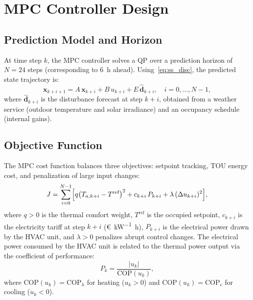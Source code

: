 \documentclass[conference,a4paper]{IEEEtran}[2015/08/26]
\newcommand{\vek}[1]{\bm{#1}}
\begin{document}
\section{MPC Controller Design}
\label{sec:mpc}

\subsection{Prediction Model and Horizon}

At time step $k$, the MPC controller solves a QP over a prediction
horizon of $N = 24$ steps (corresponding to \SI{6}{\hour} ahead).
Using~\cref{eq:ss_disc}, the predicted state trajectory is:
\begin{equation}
  \vek{x}_{k+i+1} = A\,\vek{x}_{k+i} + B\,u_{k+i} + E\,\hat{\vek{d}}_{k+i},
  \quad i = 0, \ldots, N-1,
  \label{eq:pred}
\end{equation}
where $\hat{\vek{d}}_{k+i}$ is the disturbance forecast at step $k+i$,
obtained from a weather service (outdoor temperature and solar irradiance)
and an occupancy schedule (internal gains).

\subsection{Objective Function}

The MPC cost function balances three objectives: setpoint tracking, TOU
energy cost, and penalization of large input changes:
\begin{equation}
  J = \sum_{i=0}^{N-1} \Bigl[
        q\bigl(T_{a,k+i} - T^{\text{ref}}\bigr)^2
        + c_{k+i}\, P_{k+i}
        + \lambda\, (\Delta u_{k+i})^2
      \Bigr],
  \label{eq:cost}
\end{equation}
where $q > 0$ is the thermal comfort weight, $T^{\text{ref}}$ is the
occupied setpoint, $c_{k+i}$ is the electricity tariff at step $k+i$
(\si{\euro\per\kilo\watt\hour}), $P_{k+i}$ is the electrical power
drawn by the HVAC unit, and $\lambda > 0$ penalizes abrupt control
changes. The electrical power consumed by the HVAC unit is related to
the thermal power output via the coefficient of performance:
\begin{equation}
  P_k = \frac{|u_k|}{\mathrm{COP}(u_k)},
  \label{eq:cop}
\end{equation}
where $\mathrm{COP}(u_k) = \mathrm{COP}_h$ for heating ($u_k > 0$) and
$\mathrm{COP}(u_k) = \mathrm{COP}_c$ for cooling ($u_k < 0$).
\end{document}
